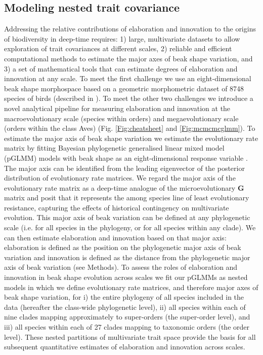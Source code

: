 \documentclass[12pt,letterpaper]{article}
\begin{document}
\subsection{Modeling nested trait covariance}
Addressing the relative contributions of elaboration and innovation to the origins of biodiversity in deep-time requires: 1) large, multivariate datasets to allow exploration of trait covariances at different scales, 2) reliable and efficient computational methods to estimate the major axes of beak shape variation, and 3) a set of mathematical tools that can estimate degrees of elaboration and innovation at any scale.
To meet the first challenge we use an eight-dimensional beak shape morphospace based on a geometric morphometric dataset of 8748 species of birds (described in \cite{hughes2022global}).
To meet the other two challenges we introduce a novel analytical pipeline for measuring elaboration and innovation at the macroevolutionary scale (species within orders) and megaevolutionary scale (orders within the class Aves) (Fig.
 \ref{Fig:cheatsheet} and \ref{Fig:mcmcmcglmm}).
To estimate the major axis of beak shape variation we estimate the evolutionary rate matrix \cite{Houle2017,Machado2020} by fitting Bayesian phylogenetic generalised linear mixed model (pGLMM) models with beak shape as an eight-dimensional response variable \cite{MCMCglmm}.
The major axis can be identified from the leading eigenvector of the posterior distribution of evolutionary rate matrices.
We regard the major axis of the evolutionary rate matrix as a deep-time analogue of the microevolutionary \textbf{G} matrix \cite{steppan2002comparative, robinson2013quantifying} and posit that it represents the among species line of least evolutionary resistance, capturing the effects of historical contingency on multivariate evolution.
This major axis of beak variation can be defined at any phylogenetic scale (i.e. for all species in the phylogeny, or for all species within any clade).
We can then estimate elaboration and innovation based on that major axis: elaboration is defined as the position on the phylogenetic major axis of beak variation and innovation is defined as the distance from the phylogenetic major axis of beak variation (see Methods). %
To assess the roles of elaboration and innovation in beak shape evolution across scales we fit our pGLMMs as nested models in which we define evolutionary rate matrices, and therefore major axes of beak shape variation, for
i) the entire phylogeny of all species included in the data (hereafter the class-wide phylogenetic level),
ii) all species within each of nine clades mapping approximately to super-orders (the super-order level), and
iii) all species within each of 27 clades mapping to taxonomic orders (the order level).
These nested partitions of multivariate trait space provide the basis for all subsequent quantitative estimates of elaboration and innovation across scales.
\end{document}
